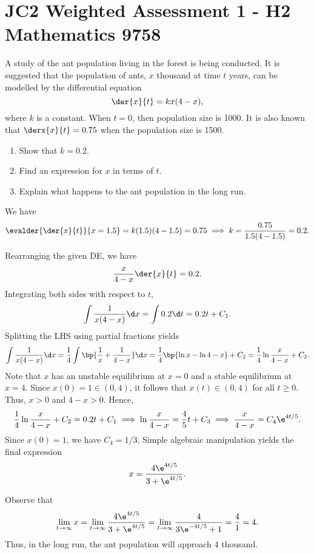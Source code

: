 \section{JC2 Weighted Assessment 1 - H2 Mathematics 9758}

\begin{problem}
    A study of the ant population living in the forest is being conducted. It is suggested that the population of ants, $x$ thousand at time $t$ years, can be modelled by the differential equation \[\der{x}{t} = kx(4-x),\] where $k$ is a constant. When $t = 0$, then population size is 1000. It is also known that $\derx{x}{t} = 0.75$ when the population size is 1500.

    \begin{enumerate}
        \item Show that $k = 0.2$.
        \item Find an expression for $x$ in terms of $t$.
        \item Explain what happens to the ant population in the long run.
    \end{enumerate}
\end{problem}
\begin{solution}
    \begin{ppart}
        We have \[\evalder{\der{x}{t}}{x = 1.5} = k(1.5)(4-1.5) = 0.75 \implies k = \frac{0.75}{1.5(4-1.5)} = 0.2.\]
    \end{ppart}
    \begin{ppart}
        Rearranging the given DE, we have \[\frac{x}{4-x} \der{x}{t} = 0.2.\] Integrating both sides with respect to $t$, \[\int \frac{1}{x(4-x)} \d x = \int 0.2 \d t = 0.2 t + C_1.\] Splitting the LHS using partial fractions yields \[\int \frac1{x(4-x)} \d x = \frac14 \int \bp{\frac1x + \frac1{4-x}} \d x = \frac14 \bp{\ln x - \ln{4-x}} + C_2 = \frac14 \ln \frac{x}{4-x} + C_2.\] Note that $x$ has an unstable equilibrium at $x = 0$ and a stable equilibrium at $x = 4$. Since $x(0) = 1 \in (0, 4)$, it follows that $x(t) \in (0, 4)$ for all $t \geq 0$. Thus, $x > 0$ and $4-x > 0$. Hence, \[\frac14 \ln\frac{x}{4-x} + C_2 = 0.2 t + C_1 \implies \ln \frac{x}{4-x} = \frac45 t + C_3 \implies \frac{x}{4-x} = C_4 \e^{4t/5}.\] Since $x(0) = 1$, we have $C_4 = 1/3$. Simple algebraic manipulation yields the final expression \[x = \frac{4\e^{4t/5}}{3 + \e^{4t/5}}.\]
    \end{ppart}
    \begin{ppart}
        Observe that \[\lim_{t \to \infty} x = \lim_{t \to \infty} \frac{4\e^{4t/5}}{3 + \e^{4t/5}} = \lim_{t \to \infty} \frac{4}{3\e^{-4t/5} + 1} = \frac41 = 4.\] Thus, in the long run, the ant population will approach 4 thousand.
    \end{ppart}
\end{solution}

